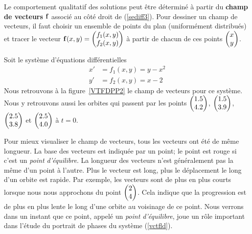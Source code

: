 {Le comportement qualitatif des solutions peut être déterminé à partir du
{\bfseries champ de vecteurs}
$\displaystyle \mathbf{f}$ associé au côté droit de (\ref{sediff3}).  Pour
dessiner un champ de vecteurs, il faut choisir un ensemble de points du
plan (uniformément distribués) et tracer le vecteur
$\displaystyle \mathbf{f}(x,y)
= \begin{pmatrix} f_1(x,y) \\ f_2(x,y) \end{pmatrix}$ à partir de
chacun de ces points $\displaystyle \begin{pmatrix} x \\ y \end{pmatrix}$.

\begin{egg}
Soit le système d'équations différentielles
\begin{equation}\label{vctfld}
\begin{split}
x' &= f_1(x,y) = y - x^2 \\
y' &= f_2(x,y) = x - 2
\end{split}
\end{equation}
Nous retrouvons à la figure~\ref{VTFDPP2} le champ de vecteurs pour ce
système.  Nous y retrouvons aussi les orbites qui passent par les points
$\displaystyle \begin{pmatrix} 1.5 \\ 4.2 \end{pmatrix}$,
$\displaystyle \begin{pmatrix} 1.5 \\ 3.9 \end{pmatrix}$,
$\displaystyle \begin{pmatrix} 2.5 \\ 3.8 \end{pmatrix}$ et
$\displaystyle \begin{pmatrix} 2.5 \\ 4.0 \end{pmatrix}$
à $t=0$.

Pour mieux visualiser le champ de vecteurs, tous les vecteurs ont été
de même longueur.  La base des vecteurs est indiquée par un point; le
point est rouge si c'est un {\em point d'équilibre}.   La longueur des
vecteurs n'est généralement pas la même d'un point à l'autre.   Plus
le vecteur est long, plus le déplacement le long d'un orbite est
rapide.   Par exemple, les vecteurs sont de plus en plus courts
lorsque nous nous approchons du point
$\displaystyle \begin{pmatrix} 2 \\ 4 \end{pmatrix}$.  Cela indique 
que la progression est de plus en plus lente le long d'une orbite au
voisinage de ce point.  Nous verrons dans un instant que ce point,
appelé un {\em point d'équilibre}, joue un rôle important dans l'étude
du portrait de phases du système (\ref{vctfld}).
\end{egg}

}
